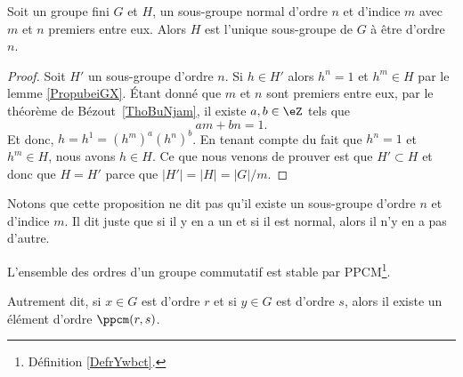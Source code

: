 \begin{proposition}     \label{PROPooVWVIooQzuAlA}
	Soit un groupe fini \( G\) et \( H\), un sous-groupe normal d'ordre \( n\) et d'indice \( m\) avec \( m\) et \( n\) premiers entre eux. Alors \( H\) est l'unique sous-groupe de \( G\) à être d'ordre \( n\).
\end{proposition}

\begin{proof}
	Soit \( H'\) un sous-groupe d'ordre \( n\). Si \( h\in H'\) alors \( h^n=1\) et \( h^m\in H\) par le lemme \ref{PropubeiGX}. Étant donné que \( m\) et \( n\) sont premiers entre eux, par le théorème de Bézout~\ref{ThoBuNjam}, il existe \( a,b\in \eZ\) tels que
	\begin{equation}
		am+bn=1.
	\end{equation}
	Et donc, \( h=h^1=(h^m)^a(h^n)^b\). En tenant compte du fait que \( h^n=1\) et \( h^m\in H\), nous avons \( h\in H\). Ce que nous venons de prouver est que \( H'\subset H\) et donc que \( H=H'\) parce que \( | H' |=| H |=| G |/m\).
\end{proof}

\begin{normaltext}
	Notons que cette proposition ne dit pas qu'il existe un sous-groupe d'ordre \( n\) et d'indice \( m\). Il dit juste que si il y en a un et si il est normal, alors il n'y en a pas d'autre.
\end{normaltext}

\begin{lemma}       \label{LemqAUBYn}
	L'ensemble des ordres d'un groupe commutatif est stable par PPCM\footnote{Définition \ref{DefrYwbct}.}.

	Autrement dit, si \( x\in G\) est d'ordre \( r\) et si \( y\in G\) est d'ordre \( s\), alors il existe un élément d'ordre \( \ppcm(r,s)\).
\end{lemma}

